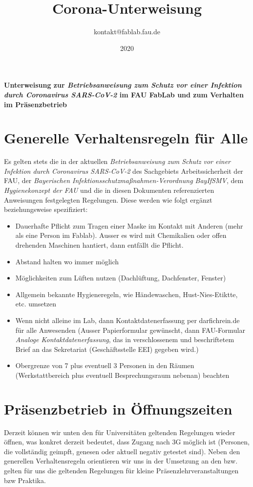 \documentclass[13pt]{\basedir/fablab-document}
\date{2020}
\author{kontakt@fablab.fau.de}
\title{Corona-Unterweisung}
\begin{document}
\maketitle

\begin{center}
  \textbf{Unterweisung zur \emph{Betriebsanweisung zum Schutz vor einer Infektion durch Coronavirus SARS-CoV-2} im FAU FabLab und zum Verhalten im Präsenzbetrieb}
\end{center}

\vbox{\vspace{1cm}}


\section{Generelle Verhaltensregeln für Alle}
Es gelten stets die in der aktuellen 
\emph{Betriebsanweisung zum Schutz vor einer Infektion durch Coronavirus SARS-CoV-2} des Sachgebiets Arbeitssicherheit der FAU, 
der \emph{Bayerischen Infektionsschutzmaßnahmen-Verordnung BayIfSMV}, 
dem \emph{Hygienekonzept der FAU} und 
die in diesen Dokumenten referenzierten Anweisungen 
festgelegten Regelungen. Diese werden wie folgt ergänzt beziehungsweise spezifiziert: 

\begin{itemize}
  \item  Dauerhafte Pflicht zum Tragen einer Maske im Kontakt mit Anderen (mehr als eine Person im Fablab). Ausser es wird mit Chemikalien oder offen drehenden Maschinen hantiert, dann entfällt die Pflicht.
  \item  Abstand halten wo immer möglich
  \item  Möglichkeiten zum Lüften nutzen (Dachlüftung, Dachfenster, Fenster)
  \item  Allgemein bekannte Hygieneregeln, wie Händewaschen, Hust-Nies-Etiktte, etc. umsetzen
  \item  Wenn nicht alleine im Lab, dann Kontaktdatenerfassung per darfichrein.de für alle Anwesenden (Ausser Papierformular gewünscht, dann FAU-Formular \emph{Analoge Kontaktdatenerfassung}, das in verschlossenem und beschriftetem Brief an das Sekretariat (Geschäftsstelle EEI) gegeben wird.) 
  \item  Obergrenze von 7 plus eventuell 3 Personen in den Räumen (Werkstattbereich plus eventuell Besprechungsraum nebenan) beachten
\end{itemize}


\section{Präsenzbetrieb in Öffnungszeiten}
Derzeit können wir unten den für Universitäten geltenden Regelungen wieder öffnen, was konkret derzeit bedeutet, dass Zugang nach 3G möglich ist (Personen, die vollständig geimpft, genesen oder aktuell negativ getestet sind).
Neben den generellen Verhaltensregeln orientieren wir uns in der Umsetzung an den bzw. gelten für uns die geltenden Regelungen für kleine Präsenzlehrveranstaltungen bzw Praktika.
\end{document}
